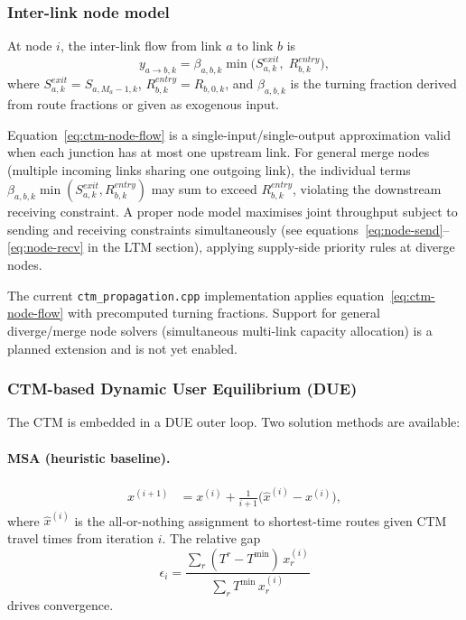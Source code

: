 \subsubsection{Inter-link node model}

At node $i$, the inter-link flow from link $a$ to link $b$ is
\begin{equation}
  y_{a\to b,k} = \beta_{a,b,k}
    \min\!\bigl(S^{exit}_{a,k},\; R^{entry}_{b,k}\bigr),
  \label{eq:ctm-node-flow}
\end{equation}
where $S^{exit}_{a,k} = S_{a,M_a-1,k}$,
$R^{entry}_{b,k} = R_{b,0,k}$, and $\beta_{a,b,k}$ is the turning
fraction derived from route fractions or given as exogenous input.

\begin{remark}
  Equation~\eqref{eq:ctm-node-flow} is a single-input/single-output
  approximation valid when each junction has at most one upstream link.
  For general merge nodes (multiple incoming links sharing one outgoing
  link), the individual terms $\beta_{a,b,k}\min(S^{exit}_{a,k},
  R^{entry}_{b,k})$ may sum to exceed $R^{entry}_{b,k}$, violating the
  downstream receiving constraint.  A proper node model maximises joint
  throughput subject to sending and receiving constraints simultaneously
  (see equations~\eqref{eq:node-send}--\eqref{eq:node-recv} in the LTM
  section), applying supply-side priority rules at diverge nodes.
\end{remark}
\begin{remark}
  The current \texttt{ctm\_propagation.cpp} implementation applies
  equation~\eqref{eq:ctm-node-flow} with precomputed turning fractions.
  Support for general diverge/merge node solvers (simultaneous
  multi-link capacity allocation) is a planned extension and is not
  yet enabled.
\end{remark}

\subsubsection{CTM-based Dynamic User Equilibrium (DUE)}

The CTM is embedded in a DUE outer loop.  Two solution methods are
available:

\paragraph{MSA (heuristic baseline).}
\begin{align}
  x^{(i+1)} &= x^{(i)} + \frac{1}{i+1}\bigl(\hat{x}^{(i)} - x^{(i)}\bigr),
  \label{eq:msa-update}
\end{align}
where $\hat{x}^{(i)}$ is the all-or-nothing assignment to shortest-time
routes given CTM travel times from iteration $i$.  The relative gap
\begin{equation}
  \epsilon_i = \frac{\sum_r (T^r - T^{\min})\,x^{(i)}_r}
                    {\sum_r T^{\min}\,x^{(i)}_r}
  \label{eq:msa-gap}
\end{equation}
drives convergence.

